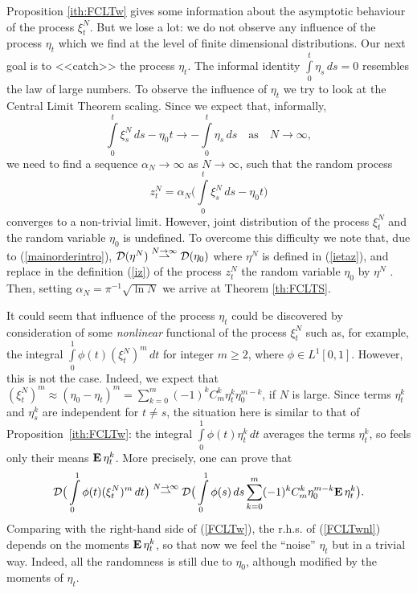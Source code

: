 \documentclass{article}
\numberwithin{equation}{section}
\newcommand{\DD}{{\cal D}}
\newcommand{\al}{\alpha}
\newcommand{\MO}{\mbox{\bf E}\,}
\newcommand{\ra}{\rightarrow}
\newcommand{\raw}{\rightharpoonup}
\newcommand{\os}{\overset}
\newcommand{\sli}{\sum\limits}
\newcommand{\ili}{\int\limits}
\newcommand{\lbl}{\label}
\newcommand{\ass}{\quad\mbox{as}\quad}
\newcommand{\rtheo}{Theorem \nolinebreak}
\newcommand{\bee}{\begin{equation}}
\newcommand{\eee}{\end{equation}}
\newcommand{\brr}{\begin{rem}}
\newcommand{\err}{\end{rem}}
\begin{document}
Proposition \ref{ith:FCLTw} gives some information about
the asymptotic behaviour
of the process $\xi_t^N$.
But we lose a lot:
we do not observe any influence of the process $\eta_t$
which we find at the level of finite dimensional distributions.
Our next goal is to <<catch>> the process $\eta_t$.
The informal identity $\ili_0^t \eta_s \,ds=0$
resembles the law of large numbers.
To observe
the influence of $\eta_t$
we try to look at
the Central Limit Theorem scaling.
Since we expect that, informally,
$$
\ili_0^t \xi_s^N \, ds -\eta_0 t \ra -\ili_0^t \eta_s \, ds
\ass N\ra\infty,
$$
we need to find a sequence $\al_N\ra\infty$ as $N\ra\infty$,
such that the random process
\bee\lbl{iz}
z^N_t=\al_N\Big(\ili_0^t\xi^N_s \,ds -\eta_0 t\Big)
\eee
converges to a non-trivial limit.
However, joint distribution of the process $\xi^N_t$ and the random variable $\eta_0$
is undefined.
To overcome this difficulty we note that,
due to (\ref{mainorderintro}),
$\DD(\eta^N)\os{N\ra\infty}\raw \DD(\eta_0)$
where
$\eta^N$
is defined in (\ref{ietaz}),
and
replace  in  the definition (\ref{iz}) of the process $z^N_t$ the random variable $\eta_0$ by $\eta^N$ .
Then, setting
 $\al_N = \pi^{-1}\sqrt{\ln N}$
we arrive at
\rtheo \ref{th:FCLTS}.
\brr
It could seem that influence of
the process $\eta_t$
could be discovered by
consideration of some {\it nonlinear}
functional of the process $\xi^N_t$
such as,
for example, the integral
$
\ili_0^1 \phi(t)(\xi^N_t)^m\, dt
$
for integer $m\geq 2$,
where $\phi\in L^1[0,1]$.
However, this is not the case.
Indeed, we expect that
$(\xi_t^N)^m \approx (\eta_0-\eta_t)^m=\sli_{k=0}^m (-1)^kC_m^k\eta_t^k\eta_0^{m-k}$,
if $N$ is large.
Since terms $\eta_t^k$ and $\eta_s^k$  are independent for $t\neq s$,
the situation here is similar to that of Proposition~\ref{ith:FCLTw}:
the integral $\ili_0^1 \phi(t)\eta_t^k \, dt$
averages the terms $\eta_t^k$,
so feels only their means $\MO\eta_t^k$.
More precisely, one can prove that
\bee\lbl{FCLTwnl}
\DD\big(\ili_0^1 \phi(t)(\xi^N_t)^m\, dt\big)
\os{N\ra\infty}\raw
\DD\big(\ili_0^1 \phi(s)\, ds \sli_{k=0}^m (-1)^kC_m^k\eta_0^{m-k} \MO\eta_t^k\big) .
\eee
Comparing with the right-hand side of (\ref{FCLTw}),
the r.h.s. of (\ref{FCLTwnl})
depends on the moments
$\MO\eta_t^k$,
so that now we feel the ``noise'' $\eta_t$ but in a trivial way.
Indeed, all the randomness is still due to $\eta_0$,
although modified by the moments of $\eta_t$.
\err
\end{document}
